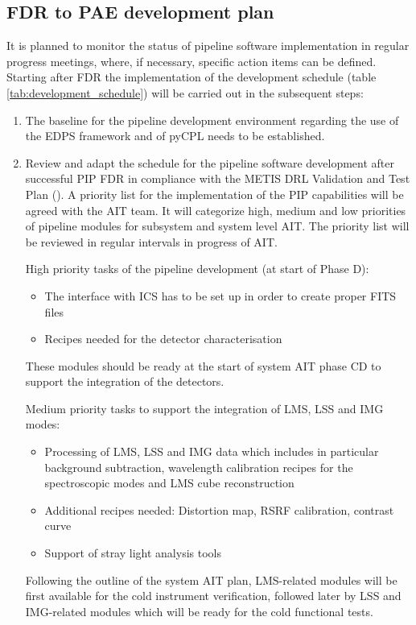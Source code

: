 \subsection{FDR to PAE development plan}
\label{ssec:fdr2pae}

It is planned to monitor the status of pipeline software implementation in regular progress meetings, where, if necessary, specific action items can be defined. Starting after FDR the implementation of the development schedule (table \ref{tab:development_schedule}) will be carried out in the subsequent steps:

\begin{enumerate}
    \item The baseline for the pipeline development environment regarding the use of the \ac{EDPS} framework and of pyCPL needs to be established.
    
    \item Review and adapt the schedule for the pipeline software development after successful PIP FDR in compliance with the METIS DRL Validation and Test Plan (\cite{DRLVT}). A priority list for the implementation of the PIP capabilities will be agreed with the AIT team. It will categorize high, medium and low priorities of pipeline modules for subsystem and system level AIT. The priority list will be reviewed in regular intervals in progress of AIT.
   
    High priority tasks of the pipeline development (at start of Phase D): 
    \begin{itemize}
        \item The interface with ICS has to be set up in order to create proper FITS files 
        \item Recipes needed for the detector characterisation
    \end{itemize} 
    These modules should be ready at the start of system AIT phase CD to support the integration of the detectors.
    
    Medium priority tasks to support the integration of \ac{LMS}, \ac{LSS} and \ac{IMG} modes:
    \begin{itemize}
        \item Processing of LMS, LSS and IMG data which includes in particular background subtraction, wavelength calibration recipes for the spectroscopic modes and LMS cube reconstruction
        \item Additional recipes needed: Distortion map, RSRF calibration, contrast curve
        \item Support of stray light analysis tools
    \end{itemize}
    Following the outline of the system AIT plan, LMS-related modules will be first available for the cold instrument verification, followed later by LSS and IMG-related modules which will be ready for the cold functional tests.


\end{enumerate}
